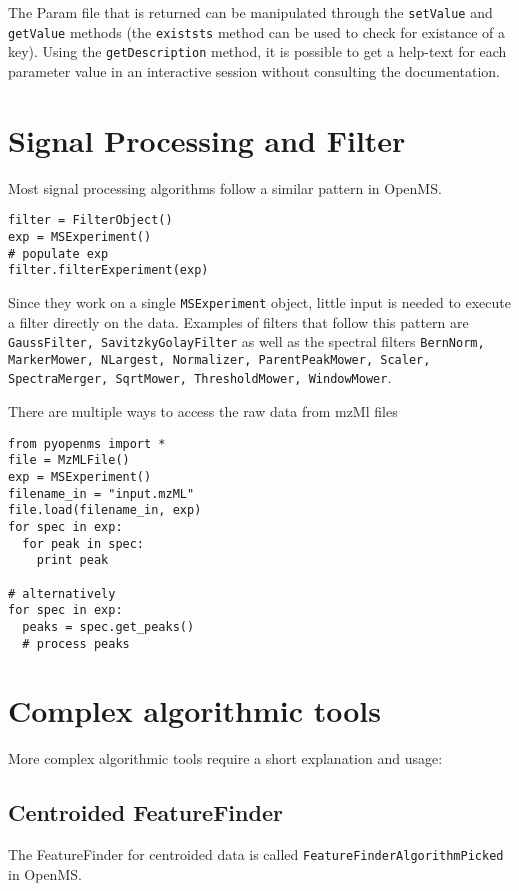 \documentclass[10pt]{article}
\begin{document}
The Param file that is returned can be manipulated through the \texttt{setValue} and
\texttt{getValue} methods (the \texttt{existsts} method can be used to check for existance of a
key). Using the \texttt{getDescription} method, it is possible to get a help-text for
each parameter value in an interactive session without consulting the documentation.

\section{Signal Processing and Filter}
Most signal processing algorithms follow a similar pattern in OpenMS.

\begin{verbatim}
filter = FilterObject()
exp = MSExperiment()
# populate exp
filter.filterExperiment(exp)
\end{verbatim}

Since they work on a single \texttt{MSExperiment} object, little input is needed to
execute a filter directly on the data. Examples of filters that follow this
pattern are \texttt{GaussFilter, SavitzkyGolayFilter} as well as the spectral
filters \texttt{BernNorm, MarkerMower, NLargest, Normalizer, ParentPeakMower,
Scaler, SpectraMerger, SqrtMower, ThresholdMower, WindowMower}.

There are multiple ways to access the raw data from mzMl files

\begin{verbatim}
from pyopenms import *
file = MzMLFile()
exp = MSExperiment()
filename_in = "input.mzML"
file.load(filename_in, exp)
for spec in exp:
  for peak in spec:
    print peak

# alternatively 
for spec in exp:
  peaks = spec.get_peaks()
  # process peaks
\end{verbatim}

\section{Complex algorithmic tools}

More complex algorithmic tools require a short explanation and usage:

\subsection{Centroided FeatureFinder}

The FeatureFinder for centroided data is called
\texttt{FeatureFinderAlgorithmPicked} in OpenMS.
\end{document}
